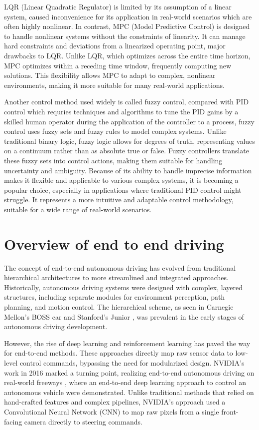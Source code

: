 LQR (Linear Quadratic Regulator) is limited by its assumption of a linear system, caused inconvenience for its application in real-world scenarios which are often highly nonlinear. In contrast, MPC (Model Predictive Control) is designed to handle nonlinear systems without the constraints of linearity. It can manage hard constraints and deviations from a linearized operating point, major drawbacks to LQR. Unlike LQR, which optimizes across the entire time horizon, MPC optimizes within a receding time window, frequently computing new solutions. This flexibility allows MPC to adapt to complex, nonlinear environments, making it more suitable for many real-world applications.

Another control method used widely is called fuzzy control, compared with PID control which requries techniques and algorithms to tune the PID gains by a skilled human operator during the application of the controller to a process, fuzzy control uses fuzzy sets and fuzzy rules to model complex systems. Unlike traditional binary logic, fuzzy logic allows for degrees of truth, representing values on a continuum rather than as absolute true or false. Fuzzy controllers translate these fuzzy sets into control actions, making them suitable for handling uncertainty and ambiguity. Because of its ability to handle imprecise information makes it flexible and applicable to various complex systems, it is becoming a popular choice, especially in applications where traditional PID control might struggle. It represents a more intuitive and adaptable control methodology, suitable for a wide range of real-world scenarios.

\section{Overview of end to end driving}

The concept of end-to-end autonomous driving has evolved from traditional hierarchical architectures to more streamlined and integrated approaches. Historically, autonomous driving systems were designed with complex, layered structures, including separate modules for environment perception, path planning, and motion control. The hierarchical scheme, as seen in Carnegie Mellon's BOSS car \parencite{urmson2008autonomous} and Stanford's Junior \parencite{buehler2009junior}, was prevalent in the early stages of autonomous driving development.

However, the rise of deep learning and reinforcement learning has paved the way for end-to-end methods. These approaches directly map raw sensor data to low-level control commands, bypassing the need for modularized design. NVIDIA's work in 2016 marked a turning point, realizing end-to-end autonomous driving on real-world freeways \parencite{bojarski2016end}, where an end-to-end deep learning approach to control an autonomous vehicle were demonstrated. Unlike traditional methods that relied on hand-crafted features and complex pipelines, NVIDIA's approach used a Convolutional Neural Network (CNN) to map raw pixels from a single front-facing camera directly to steering commands.


